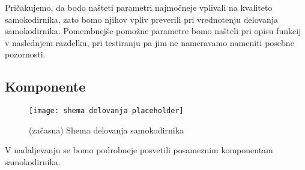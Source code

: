 \documentclass[12pt,a4paper,twoside]{article}
\theoremstyle{definition} %
\theoremstyle{plain} %
\numberwithin{equation}{section}  %
\begin{document}
Pričakujemo, da bodo našteti parametri najmočneje vplivali na kvaliteto samokodirnika, zato bomo njihov vpliv preverili pri vrednotenju delovanja samokodirnika. 
Pomembnejše pomožne parametre bomo našteli pri opisu funkcij v naslednjem razdelku, pri testiranju pa jim ne nameravamo nameniti posebne pozornosti.


\subsection{Komponente}

\begin{figure}[h!]

	\begin{center}
	\texttt{[image: shema delovanja placeholder]}
	\end{center}
	
	\caption{(začasna) Shema delovanja samokodirnika}
\end{figure}


V nadaljevanju se bomo podrobneje posvetili posameznim komponentam samokodirnika.

\end{document}
